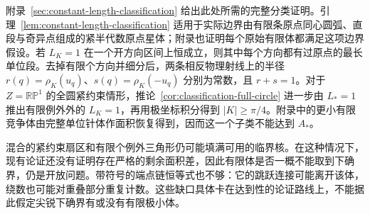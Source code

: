 附录~\ref{sec:constant-length-classification} 给出此处所需的完整分类证明。引理~\ref{lem:constant-length-classification} 适用于实际边界由有限条原点同心圆弧、直段与奇异点组成的紧半代数原点星体；附录也证明每个原始有限体都满足这项边界假设。若 $L_K=1$ 在一个开方向区间上恒成立，则其中每个方向都有过原点的最长单位段。去掉有限个方向并细分后，两条相反物理射线上的半径 $r(q)=\rho_K(u_q)$、$s(q)=\rho_K(-u_q)$ 分别为常数，且 $r+s=1$。对于 $Z=\mathbb {RP}^1$ 的全圆紧约束情形，推论~\ref{cor:classification-full-circle} 进一步由 $L_*=1$ 推出有限例外外的 $L_K=1$，再用极坐标积分得到 $|K|\ge\pi/4$。附录中的更小有限竞争体由完整单位针体作面积恢复得到，因而这一个子类不能达到 $A_*$。

混合的紧约束扇区和有限个例外三角形仍可能填满可用的临界核。在这种情况下，现有论证还没有证明存在严格的剩余面积差，因此有限体是否一概不能取到下确界，仍是开放问题。带符号的端点链恒等式也不够：它的跳跃连接可能离开该体，绕数也可能对重叠部分重复计数。这些缺口具体卡在达到性的论证路线上，不能据此假定尖锐下确界有或没有有限极小体。
